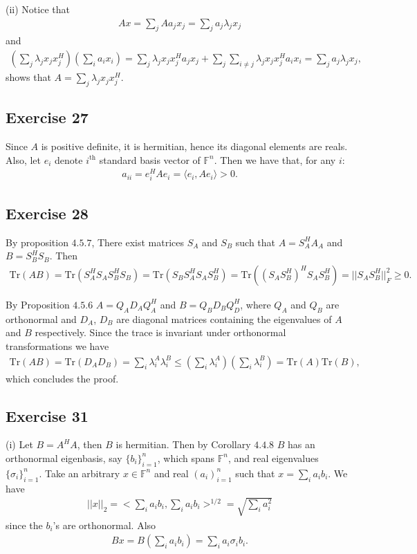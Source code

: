 \documentclass[11.5pt, letterpaper, bibtotoc,
    tablecaptionabove, figurecaptionabove]{article}
\begin{document}
(ii)
Notice that
\begin{align*}
    Ax = \sum_jAa_jx_j = \sum_ja_j\lambda_jx_j
\end{align*}
and
\begin{align*}
    \left(\sum_j\lambda_jx_jx_j^H\right)\left(\sum_ia_ix_i\right)=
    \sum_j\lambda_jx_jx_j^Ha_jx_j + \sum_j\sum_{i\neq j}\lambda_jx_jx_j^Ha_ix_i =
    \sum_ja_j\lambda_jx_j,
\end{align*}
shows that $A=\sum_j\lambda_jx_jx_j^H$.

\subsection*{Exercise 27}
Since $A$ is positive definite, it is hermitian, hence its diagonal elements are reals.
Also, let $e_i$ denote $i^\text{th}$ standard basis vector of $\mathbb F^n$.
Then we have that, for any $i$:
\begin{align*}
    a_{ii} = e_i^HAe_i = \langle e_i,Ae_i\rangle > 0.
\end{align*}

\subsection*{Exercise 28}

By proposition $4.5.7$, There exist matrices $S_A$ and $S_B$ 
such that $A=S_A^HA_A$ and $B = S_B^HS_B$.
Then 
\begin{align*}
    \text{Tr}(AB) = \text{Tr}(S_A^HS_AS_B^HS_B) =
    \text{Tr}(S_BS_A^HS_AS_B^H) = \text{Tr}((S_AS_B^H)^HS_AS_B^H)
    = ||S_AS_B^H||_F^2\geq 0.
\end{align*}

By Proposition $4.5.6$ $A=Q_AD_AQ_A^H$ and $B=Q_BD_BQ_D^H$, where $Q_A$ and $Q_B$
are orthonormal and $D_A$, $D_B$ are diagonal matrices containing the eigenvalues
of $A$ and $B$ respectively.
Since the trace is invariant under orthonormal transformations we have
\begin{align*}
    \text{Tr}(AB)=\text{Tr}(D_AD_B)=\sum_i\lambda_i^A\lambda_i^B\leq
    \left(\sum_i\lambda_i^A\right)\left(\sum_i\lambda_i^B\right)=\text{Tr}(A)\text{Tr}(B),
\end{align*}
which concludes the proof.

\subsection*{Exercise 31}
(i)
Let $B=A^HA$, then $B$ is hermitian.
Then by Corollary $4.4.8$ $B$ has an orthonormal eigenbasis, say $\{b_i\}_{i=1}^n$,
which spans $\mathbb F^n$,
and real eigenvalues $\{\sigma_i\}_{i=1}^n$.
Take an arbitrary $x\in\mathbb F^n$ and real $(a_i)_{i=1}^n$ such that
$x=\sum_ia_ib_i$.
We have 
\begin{align*}
    ||x||_2=<\sum_ia_ib_i,\sum_ia_ib_i>^{1/2}=
    \sqrt{\sum_ia_i^2}
\end{align*}
since the $b_i$'s are orthonormal.
Also
\begin{align*}
    Bx=B\left(\sum_ia_ib_i\right)=\sum_ia_i\sigma_ib_i.
\end{align*}
\end{document}
